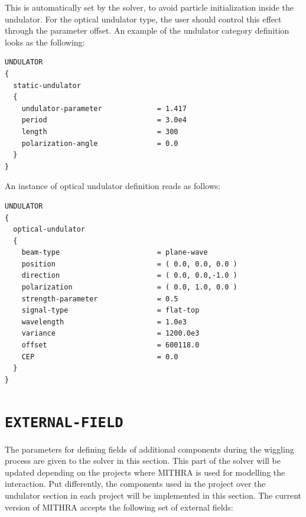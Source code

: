 %
This is automatically set by the solver, to avoid particle initialization inside the undulator.
%
For the optical undulator type, the user should control this effect through the parameter offset.
%
An example of the undulator category definition looks as the following:
%
\begin{snugshade}
\begin{Verbatim}[fontsize=\small, tabsize = 4]
UNDULATOR
{
  static-undulator
  {
    undulator-parameter             = 1.417
    period                          = 3.0e4
    length                          = 300
    polarization-angle              = 0.0
  }
}
\end{Verbatim}
\end{snugshade}
%
An instance of optical undulator definition reads as follows:
%
\begin{snugshade}
\begin{Verbatim}[fontsize=\small, tabsize = 4]
UNDULATOR
{
  optical-undulator
  {
    beam-type                       = plane-wave
    position                        = ( 0.0, 0.0, 0.0 )
    direction                       = ( 0.0, 0.0,-1.0 )
    polarization                    = ( 0.0, 1.0, 0.0 )
    strength-parameter              = 0.5
    signal-type                     = flat-top
    wavelength                      = 1.0e3
    variance                        = 1200.0e3
    offset                          = 600118.0
    CEP                             = 0.0
  }
}
\end{Verbatim}
\end{snugshade}

\section{\texttt{EXTERNAL-FIELD}}

The parameters for defining fields of additional components during the wiggling process are given to the solver in this section.
%
This part of the solver will be updated depending on the projects where MITHRA is used for modelling the interaction.
%
Put differently, the components used in the project over the undulator section in each project will be implemented in this section.
%
The current version of MITHRA accepts the following set of external fields:

